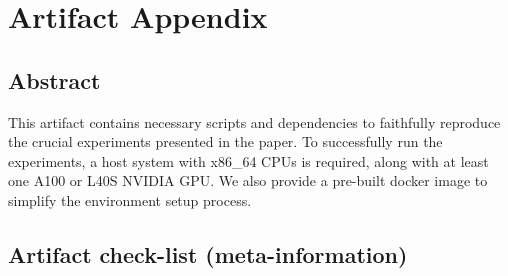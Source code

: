 








\section{Artifact Appendix}

\subsection{Abstract}

 
This artifact contains necessary scripts and dependencies
to faithfully reproduce the crucial experiments presented in the paper. To successfully run the experiments, a host system with x86\_64 CPUs is required, along with at least one A100 or L40S NVIDIA GPU. We also provide a pre-built docker image to simplify the environment setup process. 


\subsection{Artifact check-list (meta-information)}


